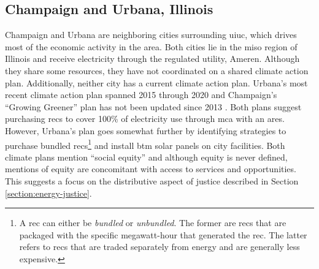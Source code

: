 \subsection{Champaign and Urbana, Illinois}
Champaign and Urbana are neighboring cities surrounding \ac{uiuc}, which drives
most of the economic activity in the area. Both cities lie in the \ac{miso}
region of Illinois and receive electricity through the regulated utility,
Ameren. Although they share some resources, they have not coordinated on a shared
climate action plan. Additionally, neither city has a current climate action
plan. Urbana's most recent climate action plan spanned 2015 through 2020
\cite{ryan_climate_2014} and Champaign's ``Growing Greener'' plan has not been
updated since 2013 \cite{knight_champaign_2013}. Both plans suggest purchasing
\acp{rec} to cover 100\% of electricity use through \ac{mca} with an \ac{ares}.
However, Urbana's plan goes somewhat further by identifying strategies to
purchase bundled \acp{rec}\footnote{A \ac{rec} can either be \textit{bundled} or
\textit{unbundled}. The former are \acp{rec} that are packaged with the specific
megawatt-hour that generated the \ac{rec}. The latter refers to \acp{rec} that
are traded separately from energy and are generally less expensive.} and install
\ac{btm} solar panels on city facilities. Both climate plans mention ``social
equity'' and although equity is never defined, mentions of equity are
concomitant with access to services and opportunities. This suggests a focus on
the distributive aspect of justice described in Section
\ref{section:energy-justice}.

